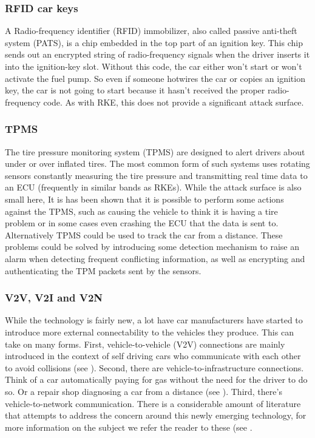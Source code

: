 \subsubsection{RFID car keys}
\label{subsubsec:rfid} 

A Radio-frequency identifier (RFID) immobilizer, also called passive anti-theft system (PATS), is a chip embedded in the top part of an ignition key. This chip sends out an encrypted string of radio-frequency signals when the driver inserts it into the ignition-key slot. Without this code, the car either won't start or won't activate the fuel pump. So even if someone hotwires the car or copies an ignition key, the car is not going to start because it hasn't received the proper radio-frequency code\cite{RFID}. As with RKE, this does not provide a significant attack surface.\cite{MillerA}

\subsubsection{TPMS} 
\label{subsubsec:tpms}

The tire pressure monitoring system (TPMS) are designed to alert drivers about under or over inflated tires. The most common form of such systems uses rotating sensors constantly measuring the tire pressure and transmitting real time data to an ECU (frequently in similar bands as RKEs)\cite{Kosher}. While the attack surface is also small here, It is has been shown that it is possible to perform some actions against the TPMS, such as causing the vehicle to think it is having a tire problem\cite{TPMS} or in some cases even crashing the ECU that the data is sent to\cite{MillerA}. Alternatively TPMS could be used to track the car from a distance\cite{TPMS}. These problems could be solved by introducing some detection mechanism to raise an alarm when detecting frequent conflicting information, as well as encrypting and authenticating the TPM packets sent by the sensors\cite{TPMS}.

\subsubsection{V2V, V2I and V2N} 
\label{subsubsec:v2v}

While the technology is fairly new, a lot have car manufacturers have started to introduce more external connectability to the vehicles they produce. This can take on many forms\cite{Ahmed}. First, vehicle-to-vehicle (V2V) connections are mainly introduced in the context of self driving cars who communicate with each other to avoid collisions (see \cite{Enisa}). Second, there are vehicle-to-infrastructure connections. Think of a car automatically paying for gas without the need for the driver to do so. Or a repair shop diagnosing a car from a distance (see \cite{Kleberger}). Third, there's vehicle-to-network communication. There is a considerable amount of literature that attempts to address the concern around this newly emerging technology, for more information on the subject we refer the reader to these (see \cite{Kleberger15}\cite{Russel17}\cite{Maxim}\cite{Crispo}.

